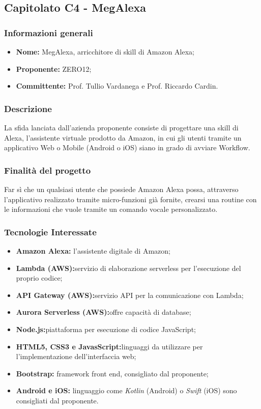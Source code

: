 \documentclass[a4paper, 11pt]{article}
\begin{document}
	\subsection{Capitolato C4 - MegAlexa}
	\subsubsection{Informazioni generali}
	\begin{itemize}
		\item \textbf{Nome: }MegAlexa, arricchitore di skill di Amazon Alexa;
		\item \textbf{Proponente: }ZERO12;
		\item \textbf{Committente: } Prof. Tullio Vardanega e Prof. Riccardo Cardin.
	\end{itemize}
	\subsubsection{Descrizione}
		La sfida lanciata dall’azienda proponente consiste di progettare una skill di Alexa, l’assistente virtuale prodotto da 				Amazon, in cui gli utenti tramite un applicativo Web o Mobile (Android o iOS) siano in grado di avviare Workflow.
	\subsubsection{Finalità del progetto}
		Far sì che un qualsiasi utente che possiede Amazon Alexa possa, attraverso l’applicativo realizzato tramite micro-funzioni 			già fornite, crearsi una routine con le informazioni che vuole tramite un comando vocale personalizzato.
	\subsubsection{Tecnologie Interessate}
	\begin{itemize}
		\item \textbf{Amazon Alexa:} l'assistente digitale di Amazon;
		\item \textbf{Lambda (AWS):}servizio di elaborazione serverless per l'esecuzione del proprio codice; 
		\item \textbf{API Gateway (AWS):}servizio API per la comunicazione con Lambda;
		\item \textbf{Aurora Serverless (AWS):}offre capacità di database;
		\item \textbf{Node.js:}piattaforma per esecuzione di codice JavaScript;
		\item \textbf{HTML5, CSS3 e JavasScript:}linguaggi da utilizzare per l'implementazione dell'interfaccia web;
		\item \textbf{Bootstrap:} framework front end, consigliato dal proponente;
		\item \textbf{Android e iOS:} linguaggio come \textit{Kotlin} (Android) o \textit{Swift} (iOS) sono consigliati dal proponente.
	\end{itemize}
\end{document}
